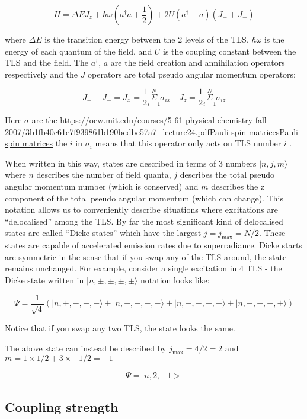 \documentclass[
]{article}
\let\oldhref\href
\renewcommand{\href}[2]{\ifx#1\urlprefix\oldhref{#1}{#2}\else\uline{\oldhref{#1}{#2}}\fi}
\renewcommand{\[}{\begin{equation}}
\renewcommand{\]}{\end{equation}}
\begin{document}
\[
H =  \Delta E J_{z} + \hbar\omega\left(a^{\dagger}a +\frac{1}{2}\right) + 2U\left( a^{\dagger} + a \right)(J_{+} + J_{-})
\label{eq:dickeHpseudo}
\]

where \(\Delta E\) is the transition energy between the 2 levels of the
TLS, \(\hbar\omega\) is the energy of each quantum of the field, and
\(U\) is the coupling constant between the TLS and the field. The
\(a^{\dagger}\), \(a\) are the field creation and annihilation operators
respectively and the \(J\) operators are total pseudo angular momentum
operators:

\[
J_{+} + J_{-} = J_{x} = \frac{1}{2}\overset{N}{\underset{i=1}{\Sigma}} \sigma_{i x} \,\,\,\,\,\, J_{z} = \frac{1}{2}\overset{N}{\underset{i=1}{\Sigma}} \sigma_{i z}
\]

Here \(\sigma\) are the
\href{https://ocw.mit.edu/courses/5-61-physical-chemistry-fall-2007/3b1fb40c61e7f939861b190bedbc57a7_lecture24.pdf}{Pauli
spin matrices} the \(i\) in \(\sigma_i\) means that this operator only
acts on TLS number \(i\) .

When written in this way, states are described in terms of 3 numbers
\(|n, j, m\rangle\) where \(n\) describes the number of field quanta,
\(j\) describes the total pseudo angular momentum number (which is
conserved) and \(m\) describes the z component of the total pseudo
angular momentum (which can change). This notation allows us to
conveniently describe situations where excitations are ``delocalised''
among the TLS. By far the most significant kind of delocalised states
are called ``Dicke states'' which have the largest \(j=j_{\max} = N/2\).
These states are capable of accelerated emission rates due to
superradiance. Dicke starts are symmetric in the sense that if you swap
any of the TLS around, the state remains unchanged. For example,
consider a single excitation in 4 TLS - the Dicke state written in
\(|n,\pm,\pm, \pm, \pm\rangle\) notation looks like:

\[
\Psi = \frac{1}{\sqrt{4}}\left(| n, +, -, -, - \rangle + | n, -, +, -, - \rangle + | n, -, -, +, - \rangle + | n, -, -, -, + \rangle \right)
\]

Notice that if you swap any two TLS, the state looks the same.

The above state can instead be described by \(j_{\max}= 4/2  = 2\) and
\(m = 1\times 1/2 + 3\times -1/2 =-1\)

\[
\Psi = |n,2,-1>
\]

\subsection{Coupling strength}\label{coupling-strength}
\end{document}
